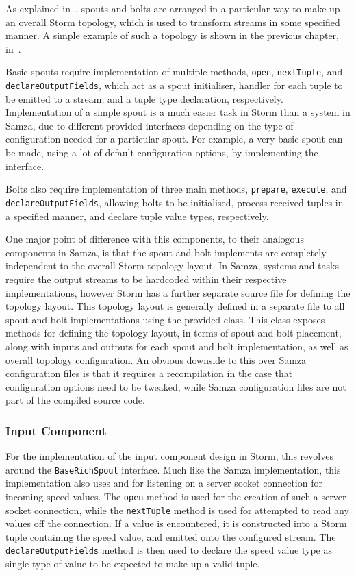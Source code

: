 As explained in~, spouts and bolts are arranged in a particular way to make up an overall Storm topology,
which is used to transform streams in some specified manner. A simple example of such a topology is shown in the previous
chapter, in~.

Basic spouts require implementation of multiple methods, \texttt{open}, \texttt{nextTuple}, and \texttt{declareOutputFields},
which act as a spout initialiser, handler for each tuple to be emitted to a stream, and a tuple type declaration, respectively.
Implementation of a simple spout is a much easier task in Storm than a system in Samza, due to different provided interfaces
depending on the type of configuration needed for a particular spout. For example, a very basic spout can be made, using
a lot of default configuration options, by implementing the  interface.

Bolts also require implementation of three main methods, \texttt{prepare}, \texttt{execute}, and \texttt{declareOutputFields},
allowing bolts to be initialised, process received tuples in a specified manner, and declare tuple value types, respectively.

One major point of difference with this components, to their analogous components in Samza, is that the spout and bolt
implements are completely independent to the overall Storm topology layout. In Samza, systems and tasks require the output
streams to be hardcoded within their respective implementations, however Storm has a further separate source file for
defining the topology layout. This topology layout is generally defined in a separate file to all spout and bolt implementations
using the provided  class. This class exposes methods for defining the
topology layout, in terms of spout and bolt placement, along with inputs and outputs for each spout and bolt implementation,
as well as overall topology configuration. An obvious downside to this over Samza configuration files is that it requires
a recompilation in the case that configuration options need to be tweaked, while Samza configuration files are not part
of the compiled source code.

\subsubsection{Input Component}

For the implementation of the input component design in Storm, this revolves around the \texttt{BaseRichSpout} interface.
Much like the Samza implementation, this implementation also uses  and 
for listening on a server socket connection for incoming speed values. The \texttt{open} method is used for the creation
of such a server socket connection, while the \texttt{nextTuple} method is used for attempted to read any values off the
connection. If a value is encountered, it is constructed into a Storm tuple containing the speed value, and emitted onto
the configured stream. The \texttt{declareOutputFields} method is then used to declare the speed value type as single
type of value to be expected to make up a valid tuple.

